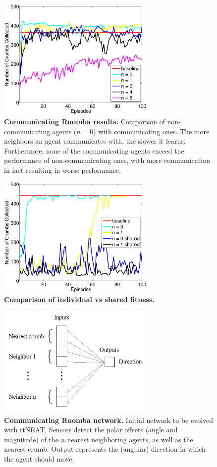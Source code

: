 \documentclass[conference]{IEEEtran}
\begin{document}
\begin{figure}[t]
\centering
\includegraphics[width=3.0in]{./figures/neroevolution/comm_result.eps}
\caption{\textbf{Communicating Roomba results.} Comparison of non-communicating agents ($n=0$) with communicating ones. The more neighbors an agent communicates with, the slower it learns. Furthermore, none of the communicating agents exceed the performance of non-communicating ones, with more communication in fact resulting in worse performance. }
\label{neroevolution:communication_results}
\end{figure}

\begin{figure}[t]
\centering
\includegraphics[width=3.0in]{./figures/neroevolution/shared_result.eps}
\caption{\textbf{Comparison of individual vs shared fitness.}}
\label{neroevolution:shared_fitness}
\end{figure}

\begin{figure}[t]
\centering
\includegraphics[width=3.0in]{./figures/neroevolution/comm_network.png}
\caption{\textbf{Communicating Roomba network.} Initial network to be evolved with rtNEAT. Sensors detect the polar offsets (angle and magnitude) of the $n$ nearest neighboring agents, as well as the nearest crumb. Output represents the (angular) direction in which the agent should move.}
\label{neroevolution:communication}
\end{figure}
\end{document}
